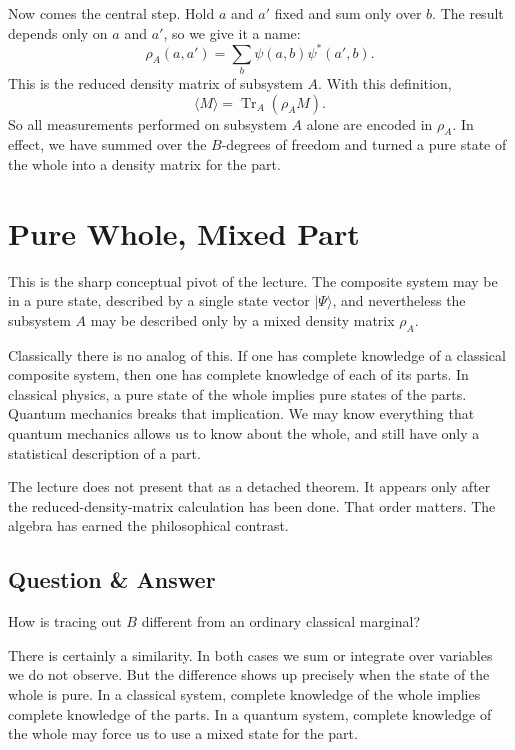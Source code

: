 Now comes the central step. Hold \(a\) and \(a'\) fixed and sum only over \(b\). The result depends only on \(a\) and \(a'\), so we give it a name:
\begin{equation}
\rho_A(a,a') = \sum_b \psi(a,b)\psi^*(a',b).
\end{equation}
This is the reduced density matrix of subsystem \(A\). With this definition,
\begin{equation}
\langle M\rangle = \operatorname{Tr}_A(\rho_A M).
\end{equation}
So all measurements performed on subsystem \(A\) alone are encoded in \(\rho_A\). In effect, we have summed over the \(B\)-degrees of freedom and turned a pure state of the whole into a density matrix for the part.

\section{Pure Whole, Mixed Part}

This is the sharp conceptual pivot of the lecture. The composite system may be in a pure state, described by a single state vector \(|\Psi\rangle\), and nevertheless the subsystem \(A\) may be described only by a mixed density matrix \(\rho_A\).

Classically there is no analog of this. If one has complete knowledge of a classical composite system, then one has complete knowledge of each of its parts. In classical physics, a pure state of the whole implies pure states of the parts. Quantum mechanics breaks that implication. We may know everything that quantum mechanics allows us to know about the whole, and still have only a statistical description of a part.

The lecture does not present that as a detached theorem. It appears only after the reduced-density-matrix calculation has been done. That order matters. The algebra has earned the philosophical contrast.

\subsection{Question \& Answer}

How is tracing out \(B\) different from an ordinary classical marginal?

There is certainly a similarity. In both cases we sum or integrate over variables we do not observe. But the difference shows up precisely when the state of the whole is pure. In a classical system, complete knowledge of the whole implies complete knowledge of the parts. In a quantum system, complete knowledge of the whole may force us to use a mixed state for the part.

